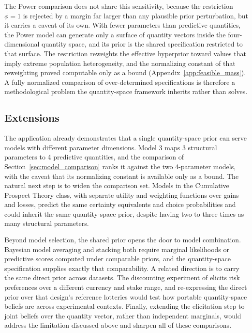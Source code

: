 \documentclass[12pt,a4paper]{article}
\theoremstyle{definition}
\theoremstyle{remark}
\begin{document}
The Power comparison does not share this sensitivity, because the
restriction $\phi = 1$ is rejected by a margin far larger than any
plausible prior perturbation, but it carries a caveat of its own. With
fewer parameters than predictive quantities, the Power model can
generate only a surface of quantity vectors inside the four-dimensional
quantity space, and its prior is the shared specification restricted to
that surface. The restriction reweights the effective hyperprior toward
values that imply extreme population heterogeneity, and the normalizing
constant of that reweighting proved computable only as a bound
(Appendix~\ref{app:feasible_mass}). A fully normalized comparison of
over-determined specifications is therefore a methodological problem
the quantity-space framework inherits rather than solves.

\subsection{Extensions}

The application already demonstrates that a single quantity-space prior can
serve models with different parameter dimensions. Model 3 maps 3 structural
parameters to 4 predictive quantities, and the
comparison of Section~\ref{sec:model_comparison} ranks it against the two
4-parameter models, with the caveat that its normalizing constant is
available only as a bound. The natural next
step is to widen the comparison set. Models in the Cumulative Prospect
Theory class, with separate utility and weighting functions over gains and
losses, predict the same certainty equivalents and choice probabilities and
could inherit the same quantity-space prior, despite having two to three
times as many structural parameters.

Beyond model selection, the shared prior opens the door to model combination.
Bayesian model averaging and stacking both require marginal likelihoods or
predictive scores computed under comparable priors, and the quantity-space
specification supplies exactly that comparability. A related direction is to
carry the same direct prior across datasets. The discounting experiment of
\textcite{Andersen2008} elicits risk preferences over a different currency
and stake range, and re-expressing the direct prior over that design's
reference lotteries would test how portable quantity-space beliefs are across
experimental contexts. Finally, extending the elicitation step to joint
beliefs over the quantity vector, rather than independent marginals, would
address the limitation discussed above and sharpen all of these comparisons.
\end{document}
